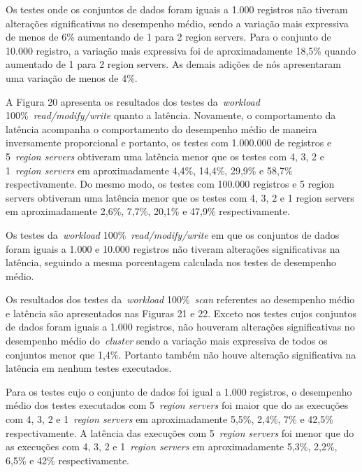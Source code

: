 \documentclass[12pt]{article}
\begin{document}
Os testes onde os conjuntos de dados foram iguais a 1.000 registros não tiveram alterações significativas no desempenho médio, sendo a variação mais expressiva de menos de 6\% aumentando de 1 para 2 region servers. Para o conjunto de 10.000 registro, a variação mais expressiva foi de aproximadamente 18,5\% quando aumentado de 1 para 2 region servers. As demais adições de nós apresentaram uma variação de menos de 4\%.

A Figura 20 apresenta os resultados dos testes da~\emph{workload} 100\%~\emph{read/modify/write} quanto a latência. Novamente, o comportamento da latência acompanha o comportamento do desempenho médio de maneira inversamente proporcional e portanto, os testes com 1.000.000 de registros e 5~\emph{region servers} obtiveram uma latência menor que os testes com 4, 3, 2 e 1~\emph{region servers} em aproximadamente 4,4\%, 14,4\%, 29,9\% e 58,7\% respectivamente. 
Do mesmo modo, os testes com 100.000 registros e 5 region servers obtiveram uma latência menor que os testes com 4, 3, 2 e 1 region servers em aproximadamente 2,6\%, 7,7\%, 20,1\% e 47,9\% respectivamente.

Os testes da~\emph{workload} 100\%~\emph{read/modify/write} em que os conjuntos de dados foram iguais a 1.000 e 10.000 registros não tiveram alterações significativas na latência, seguindo a mesma porcentagem calculada nos testes de desempenho médio.

Os resultados dos testes da~\emph{workload} 100\%~\emph{scan} referentes ao desempenho médio e latência são apresentados nas Figuras 21 e 22. 
Exceto nos testes cujos conjuntos de dados foram iguais a 1.000 registros, não houveram alterações significativas no desempenho médio do~\emph{cluster}  sendo a variação mais expressiva de todos os conjuntos menor que 1,4\%. 
Portanto também não houve alteração significativa na latência em nenhum testes executados.

Para os testes cujo o conjunto de dados foi igual a 1.000 registros, o desempenho médio dos testes executados com 5~\emph{region servers} foi maior que do as execuções com 4, 3, 2 e 1~\emph{region servers} em aproximadamente 5,5\%, 2,4\%, 7\% e 42,5\% respectivamente.
A latência das execuções com 5~\emph{region servers} foi menor que do as execuções com 4, 3, 2 e 1~\emph{region servers} em aproximadamente 5,3\%, 2,2\%, 6,5\% e 42\% respectivamente.
\end{document}
